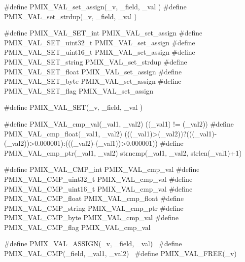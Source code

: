 \cspecificstart
\begin{codepar}

#define PMIX_VAL_set_assign(_v, _field, _val )
#define PMIX_VAL_set_strdup(_v, _field, _val )

#define PMIX_VAL_SET_int        PMIX_VAL_set_assign
#define PMIX_VAL_SET_uint32_t   PMIX_VAL_set_assign
#define PMIX_VAL_SET_uint16_t   PMIX_VAL_set_assign
#define PMIX_VAL_SET_string     PMIX_VAL_set_strdup
#define PMIX_VAL_SET_float      PMIX_VAL_set_assign
#define PMIX_VAL_SET_byte       PMIX_VAL_set_assign
#define PMIX_VAL_SET_flag       PMIX_VAL_set_assign

#define PMIX_VAL_SET(_v, _field, _val )
\end{codepar}
\cspecificend


\cspecificstart
\begin{codepar}

#define PMIX_VAL_cmp_val(_val1, _val2)      ((_val1) != (_val2))
#define PMIX_VAL_cmp_float(_val1, _val2)    (((_val1)>(_val2))?(((_val1)-(_val2))>0.000001):(((_val2)-(_val1))>0.000001))
#define PMIX_VAL_cmp_ptr(_val1, _val2)      strncmp(_val1, _val2, strlen(_val1)+1)

#define PMIX_VAL_CMP_int        PMIX_VAL_cmp_val
#define PMIX_VAL_CMP_uint32_t   PMIX_VAL_cmp_val
#define PMIX_VAL_CMP_uint16_t   PMIX_VAL_cmp_val
#define PMIX_VAL_CMP_float      PMIX_VAL_cmp_float
#define PMIX_VAL_CMP_string     PMIX_VAL_cmp_ptr
#define PMIX_VAL_CMP_byte       PMIX_VAL_cmp_val
#define PMIX_VAL_CMP_flag       PMIX_VAL_cmp_val
\end{codepar}
\cspecificend


\cspecificstart
\begin{codepar}

#define PMIX_VAL_ASSIGN(_v, _field, _val) \
#define PMIX_VAL_CMP(_field, _val1, _val2) \
#define PMIX_VAL_FREE(_v) \
\end{codepar}
\cspecificend


